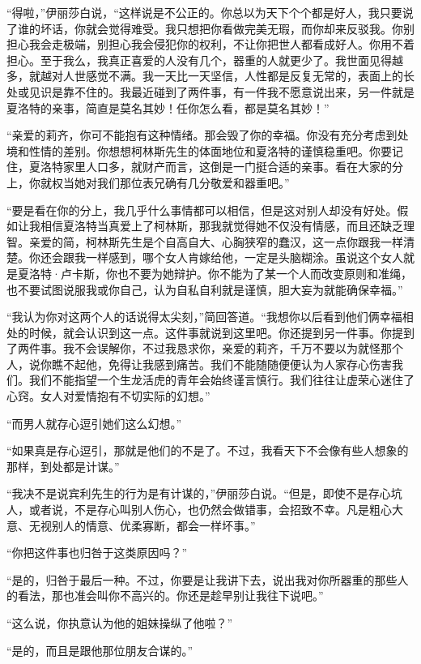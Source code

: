 \par “得啦，”伊丽莎白说，“这样说是不公正的。你总以为天下个个都是好人，我只要说了谁的坏话，你就会觉得难受。我只想把你看做完美无瑕，而你却来反驳我。你别担心我会走极端，别担心我会侵犯你的权利，不让你把世人都看成好人。你用不着担心。至于我么，我真正喜爱的人没有几个，器重的人就更少了。我世面见得越多，就越对人世感觉不满。我一天比一天坚信，人性都是反复无常的，表面上的长处或见识是靠不住的。我最近碰到了两件事，有一件我不愿意说出来，另一件就是夏洛特的亲事，简直是莫名其妙！任你怎么看，都是莫名其妙！”
\par “亲爱的莉齐，你可不能抱有这种情绪。那会毁了你的幸福。你没有充分考虑到处境和性情的差别。你想想柯林斯先生的体面地位和夏洛特的谨慎稳重吧。你要记住，夏洛特家里人口多，就财产而言，这倒是一门挺合适的亲事。看在大家的分上，你就权当她对我们那位表兄确有几分敬爱和器重吧。”
\par “要是看在你的分上，我几乎什么事情都可以相信，但是这对别人却没有好处。假如让我相信夏洛特当真爱上了柯林斯，那我就觉得她不仅没有情感，而且还缺乏理智。亲爱的简，柯林斯先生是个自高自大、心胸狭窄的蠢汉，这一点你跟我一样清楚。你还会跟我一样感到，哪个女人肯嫁给他，一定是头脑糊涂。虽说这个女人就是夏洛特·卢卡斯，你也不要为她辩护。你不能为了某一个人而改变原则和准绳，也不要试图说服我或你自己，认为自私自利就是谨慎，胆大妄为就能确保幸福。”
\par “我认为你对这两个人的话说得太尖刻，”简回答道。“我想你以后看到他们俩幸福相处的时候，就会认识到这一点。这件事就说到这里吧。你还提到另一件事。你提到了两件事。我不会误解你，不过我恳求你，亲爱的莉齐，千万不要以为就怪那个人，说你瞧不起他，免得让我感到痛苦。我们不能随随便便认为人家存心伤害我们。我们不能指望一个生龙活虎的青年会始终谨言慎行。我们往往让虚荣心迷住了心窍。女人对爱情抱有不切实际的幻想。”
\par “而男人就存心逗引她们这么幻想。”
\par “如果真是存心逗引，那就是他们的不是了。不过，我看天下不会像有些人想象的那样，到处都是计谋。”
\par “我决不是说宾利先生的行为是有计谋的，”伊丽莎白说。“但是，即使不是存心坑人，或者说，不是存心叫别人伤心，也仍然会做错事，会招致不幸。凡是粗心大意、无视别人的情意、优柔寡断，都会一样坏事。”
\par “你把这件事也归咎于这类原因吗？”
\par “是的，归咎于最后一种。不过，你要是让我讲下去，说出我对你所器重的那些人的看法，那也准会叫你不高兴的。你还是趁早别让我往下说吧。”
\par “这么说，你执意认为他的姐妹操纵了他啦？”
\par “是的，而且是跟他那位朋友合谋的。”
